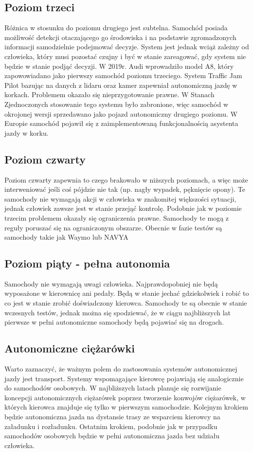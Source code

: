 \subsection{Poziom trzeci}
Różnica w stosunku do poziomu drugiego jest subtelna. Samochód posiada możliwość detekcji otaczającego go środowiska i na podstawie zgromadzonych informacji samodzielnie podejmować decyzje. System jest jednak wciąż zależny od człowieka, który musi pozostać czujny i być w stanie zareagować, gdy system nie będzie w stanie podjąć decyzji. W 2019r. Audi wprowadziło model A8, który zapowowiadano jako pierwszy samochód poziomu trzeciego. System Traffic Jam Pilot bazując na danych z lidaru oraz kamer zapewniał autonomiczną jazdę w korkach. Problemem okazało się nieprzygotowanie prawne. W Stanach Zjednoczonych stosowanie tego systemu było zabronione, więc samochód w okrojonej wersji sprzedawano jako pojazd autonomiczny drugiego poziomu. W Europie samochód pojawił się z zaimplementowaną funkcjonalnością asystenta jazdy w korku.

\subsection{Poziom czwarty}
Poziom czwarty zapewnia to czego brakowało w niższych poziomach, a więc może interweniować jeśli coś pójdzie nie tak (np. nagły wypadek, pęknięcie opony). Te samochody nie wymagają akcji w człowieka w znakomitej większości sytuacji, jednak człowiek zawsze jest w stanie przejąć kontrolę. Podobnie jak w poziomie trzecim problemem okazały się ograniczenia prawne. Samochody te mogą z reguły poruszać się na ograniczonym obszarze. Obecnie w fazie testów są samochody takie jak Waymo lub NAVYA

\subsection{Poziom piąty - pełna autonomia}
Samochody nie wymagają uwagi człowieka. Najprawdopobniej nie będą wyposażone w kierownicę ani pedały. Będą w stanie jechać gdziekolwiek i robić to co jest w stanie zrobić doświadczony kierowca. Samochody te są obecnie w stanie wczesnych testów, jednak można się spodziewać, że w ciągu najbliższych lat pierwsze w pełni autonomiczne samochody będą pojawiać się na drogach.

\subsection{Autonomiczne ciężarówki}
Warto zaznaczyć, że ważnym polem do zastosowania systemów autonomicznej jazdy jest transport. Systemy wspomagające kierowcę pojawiają się analogicznie do samochodów osobowych. W najbliższych latach planuje się rozwijanie koncepcji autonomicznych ciężarówek poprzez tworzenie konwojów ciężarówek, w których kierowca znajduje się tylko w pierwszym samochodzie. Kolejnym krokiem będzie autonomiczna jazda na dystansie trasy ze wsparciem kierowcy na załadunku i rozładunku. Ostatnim krokiem, podobnie jak w przypadku samochodów osobowych będzie w pełni autonomiczna jazda bez udziału człowieka.

